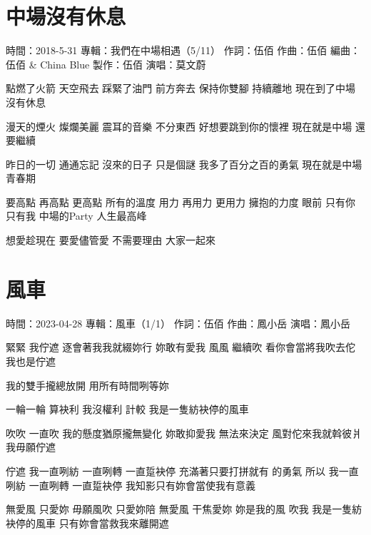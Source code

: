 \documentclass[UTF8,a4paper,oneside,twocolumn,12pt]{ctexbook}
\newcommand{\infopair}[2]{\textbullet #1：#2}
\newcommand{\zc}[1][伍佰]{\infopair{作詞}{#1}}
\newcommand{\zq}[1][伍佰]{\infopair{作曲}{#1}}
\newcommand{\bq}[1][伍佰]{\infopair{編曲}{#1}}
\newcommand{\zj}[1]{\infopair{專輯}{#1}}
\newcommand{\zz}[1]{\infopair{製作}{#1}}
\newcommand{\sj}[1]{\infopair{時間}{#1}}
\newenvironment{info}{\begin{flushleft}\kaishu
	}
	{\end{flushleft}\normalsize\yahei\par}
\newenvironment{lyric}{
	}
{}
\begin{document}
\section{中場沒有休息}
\begin{info}
	\sj{2018-5-31}
	\zj{我們在中場相遇（5/11）}
	\zc
	\zq
	\bq[伍佰 \& China Blue]
	\zz{伍佰}
	\infopair{演唱}{莫文蔚}
\end{info}
\begin{lyric}
	點燃了火箭 天空飛去
	踩緊了油門 前方奔去
	保持你雙腳 持續離地
	現在到了中場 沒有休息

	漫天的煙火 燦爛美麗
	震耳的音樂 不分東西
	好想要跳到你的懷裡
	現在就是中場 還要繼續

	昨日的一切 通通忘記
	沒來的日子 只是個謎
	我多了百分之百的勇氣
	現在就是中場青春期

	要高點 再高點 更高點 所有的溫度
	用力 再用力 更用力 擁抱的力度
	眼前 只有你 只有我 中場的Party
	人生最高峰

	想愛趁現在 要愛儘管愛
	不需要理由 大家一起來
\end{lyric}

\section{風車}
\begin{info}
	\sj{2023-04-28}
	\zj{風車（1/1）}
	\zc
	\zq[鳳小岳]
	\infopair{演唱}{鳳小岳}
\end{info}
\begin{lyric}
	緊緊 我佇遮
	逐會著我我就綴妳行
	妳敢有愛我
	風風 繼續吹
	看你會當將我吹去佗
	我也是佇遮

	我的雙手攏總放開
	用所有時間咧等妳

	一輪一輪 算袂利
	我沒權利 計較
	我是一隻紡袂停的風車

	吹吹 一直吹
	我的懸度猶原攏無變化
	妳敢抑愛我
	無法來決定
	風對佗來我就斡彼爿
	我毋願佇遮

	佇遮 我一直咧紡 一直咧轉 一直踅袂停
	充滿著只要打拼就有 的勇氣
	所以 我一直咧紡 一直咧轉 一直踅袂停
	我知影只有妳會當使我有意義

	無愛風 只愛妳 毋願風吹 只愛妳陪 無愛風 干焦愛妳 妳是我的風 吹我
	我是一隻紡袂停的風車 只有妳會當救我來離開遮
\end{lyric}
\end{document}
